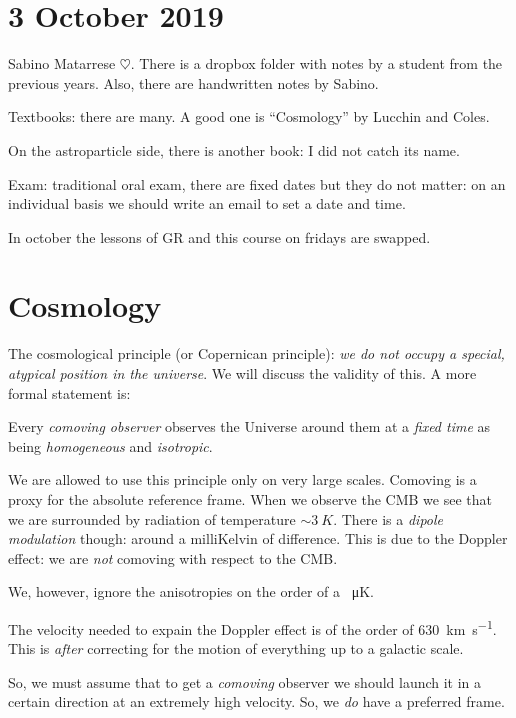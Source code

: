 \documentclass[main.tex]{subfiles}
\begin{document}
\section*{3 October 2019}

Sabino Matarrese \(\heartsuit\).
There is a dropbox folder with notes by a student from the previous years.
Also, there are handwritten notes by Sabino.

Textbooks: there are many. A good one is ``Cosmology'' by Lucchin and Coles.

On the astroparticle side, there is another book: I did not catch its name.

Exam: traditional oral exam, there are fixed dates but they do not matter: on an individual basis we should write an email to set a date and time.

In october the lessons of GR and this course on fridays are swapped.

\section{Cosmology}

The cosmological principle (or Copernican principle): \emph{we do not occupy a special, atypical position in the universe}. We will discuss the validity of this. A more formal statement is:
%
\begin{proposition}
    Every \emph{comoving observer} observes the Universe around them at a \emph{fixed time} as being \emph{homogeneous} and \emph{isotropic}.
\end{proposition}

We are allowed to use this principle only on very large scales.
Comoving is a proxy for the absolute reference frame.
When we observe the CMB we see that we are surrounded by radiation of temperature \(\sim \SI{3}{K}\).
There is a \emph{dipole modulation} though: around a milliKelvin of difference. This is due to the Doppler effect: we are \emph{not} comoving with respect to the CMB.

We, however, ignore the anisotropies on the order of a \SI{}{\micro K}.

The velocity needed to expain the Doppler effect is of the order of \SI{630}{\kilo\metre\per\second}.
This is \emph{after} correcting for the motion of everything up to a galactic scale.

So, we must assume that to get a \emph{comoving} observer we should launch it in a certain direction at an extremely high velocity. So, we \emph{do} have a preferred frame.
\end{document}
